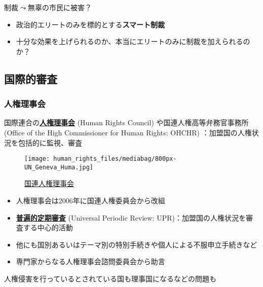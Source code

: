 \documentclass[
  xelatex,
  ja=standard]{bxjsarticle}
\providecommand{\tightlist}{%
  \setlength{\itemsep}{0pt}\setlength{\parskip}{0pt}}\usepackage{longtable,booktabs,array}
\begin{document}
制裁\(\leadsto\)無辜の市民に被害？

\begin{itemize}
\tightlist
\item
  政治的エリートのみを標的とする\textbf{スマート制裁}
\item
  十分な効果を上げられるのか、本当にエリートのみに制裁を加えられるのか？
\end{itemize}

\hypertarget{ux56fdux969bux7684ux5be9ux67fb}{%
\subsection{国際的審査}\label{ux56fdux969bux7684ux5be9ux67fb}}

\hypertarget{ux4ebaux6a29ux7406ux4e8bux4f1a}{%
\subsubsection{人権理事会}\label{ux4ebaux6a29ux7406ux4e8bux4f1a}}

国際連合の\href{https://www.mofa.go.jp/mofaj/gaiko/jinken_r/index.html}{\textbf{人権理事会}}
(Human Rights Council) や国連人権高等弁務官事務所 (Office of the High
Commissioner for Human Rights: OHCHR)
：加盟国の人権状況を包括的に監視、審査

\begin{figure}[htpb]

{\centering \texttt{[image: human\_rights\_files/mediabag/800px-UN\_Geneva\_Huma.jpg]}

}

\caption{\href{https://commons.wikimedia.org/wiki/File:UN_Geneva_Human_Rights_and_Alliance_of_Civilizations_Room.jpg}{国連人権理事会}}

\end{figure}

\begin{itemize}
\tightlist
\item
  人権理事会は2006年に国連人権委員会から改組
\item
  \href{https://www.mofa.go.jp/mofaj/gaiko/jinken_r/upr_gai.html}{\textbf{普遍的定期審査}}
  (Universal Periodic Review: UPR)：加盟国の人権状況を審査する中心的活動
\item
  他にも国別あるいはテーマ別の特別手続きや個人による不服申立手続きなど
\item
  専門家からなる人権理事会諮問委員会から助言
\end{itemize}

人権侵害を行っているとされている国も理事国になるなどの問題も
\end{document}
